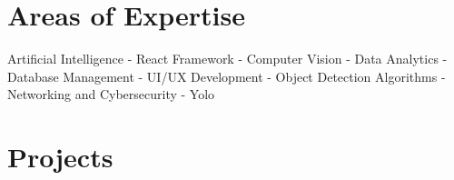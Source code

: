 \documentclass[a4paper,12pt]{article}
\begin{document}
\section{Areas of Expertise}
{Artificial Intelligence - React Framework - Computer Vision - Data Analytics - Database Management - UI/UX Development - Object Detection Algorithms - Networking and Cybersecurity - Yolo }




\section{Projects}
\end{document}
